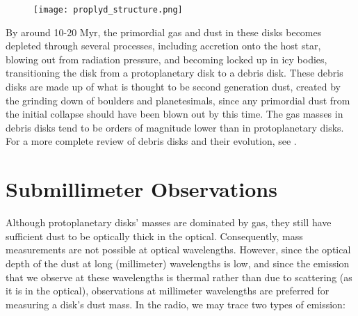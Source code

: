 \begin{figure}[htp]
  \hspace*{\fill}%
  \texttt{[image: proplyd\_structure.png]}\hfill%
  \hspace*{\fill}%
  \label{fig:proplyd_str}
\end{figure}



By around 10-20 Myr, the primordial gas and dust in these disks becomes depleted through several processes, including accretion onto the host star, blowing out from radiation pressure, and becoming locked up in icy bodies, transitioning the disk from a protoplanetary disk to a debris disk. These debris disks are made up of what is thought to be second generation dust, created by the grinding down of boulders and planetesimals, since any primordial dust from the initial collapse should have been blown out by this time. The gas masses in debris disks tend to be orders of magnitude lower than in protoplanetary disks. For a more complete review of debris disks and their evolution, see \citet{Hughes2018}.




\section{Submillimeter Observations}

Although protoplanetary disks' masses are dominated by gas, they still have sufficient dust to be optically thick in the optical. Consequently, mass measurements are not possible at optical wavelengths. However, since the optical depth of the dust at long (millimeter) wavelengths is low, and since the emission that we observe at these wavelengths is thermal rather than due to scattering (as it is in the optical), observations at millimeter wavelengths are preferred for measuring a disk's dust mass. In the radio, we may trace two types of emission:

